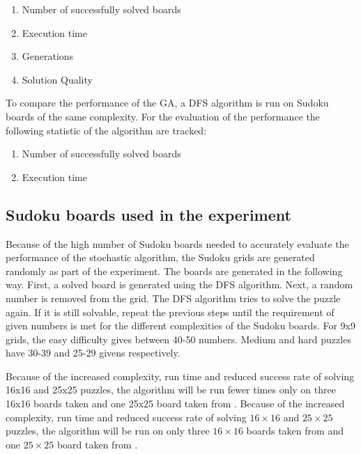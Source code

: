 \begin{enumerate}
	\item Number of successfully solved boards
	\item Execution time
	\item Generations
	\item Solution Quality
\end{enumerate}

To compare the performance of the GA, a DFS algorithm is run on Sudoku boards of the same complexity. For the evaluation of the performance the following statistic of the algorithm are tracked:
\begin{enumerate}
	\item Number of successfully solved boards
	\item Execution time
\end{enumerate}

\subsection{Sudoku boards used in the experiment}
Because of the high number of Sudoku boards needed to accurately evaluate the performance of the stochastic algorithm, the Sudoku grids are generated randomly as part of the experiment. The boards are generated in the following way. 
First, a solved board is generated using the DFS algorithm. Next, a random number is removed from the grid. The DFS algorithm tries to solve the puzzle again. If it is still solvable, repeat the previous steps until the requirement of given numbers is met for the different complexities of the Sudoku boards. For 9x9 grids, the easy difficulty gives between 40-50 numbers. Medium and hard puzzles have 30-39 and 25-29 givens respectively.

Because of the increased complexity, run time and reduced success rate of solving 16x16 and 25x25 puzzles, the algorithm will be run fewer times only on three 16x16 boards taken and one 25x25 board taken from \cite{Sudoku16,Sudoku25}.
Because of the increased complexity, run time and reduced success rate of solving $16 \times 16$ and $25 \times 25$ puzzles, the algorithm will be run on only three $16 \times 16$ boards taken from \cite{Sudoku16} and one $25 \times 25$ board taken from \cite{Sudoku25}.